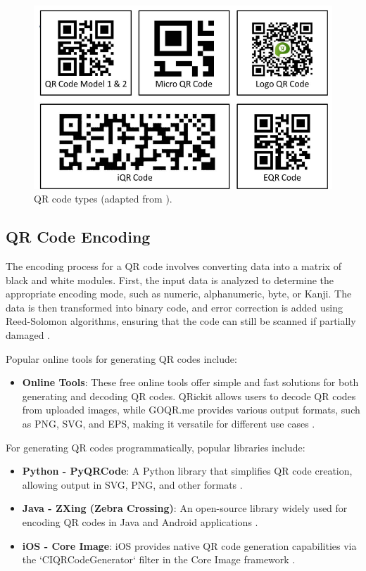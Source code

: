 \begin{figure}
	\centering
	\includegraphics[width=0.7\linewidth]{assets/ch2/qr_codes_type}
	\caption{QR code types (adapted from \cite{Tiwari2016}).}
	\label{qr_code_type}
\end{figure}

\subsection{QR Code Encoding}  
The encoding process for a QR code involves converting data into a matrix of black and white modules. First, the input data is analyzed to determine the appropriate encoding mode, such as numeric, alphanumeric, byte, or Kanji. The data is then transformed into binary code, and error correction is added using Reed-Solomon algorithms, ensuring that the code can still be scanned if partially damaged \cite{Tiwari2016}.

Popular online tools for generating QR codes include:
\begin{itemize}
	\item \textbf{Online Tools}: These free online tools offer simple and fast solutions for both generating and decoding QR codes. QRickit allows users to decode QR codes from uploaded images, while GOQR.me provides various output formats, such as PNG, SVG, and EPS, making it versatile for different use cases \cite{QRCodeMonkey2024}\cite{QRTiger2024}.
	
	
\end{itemize}

For generating QR codes programmatically, popular libraries include:
\begin{itemize}
	\item \textbf{Python - PyQRCode}: A Python library that simplifies QR code creation, allowing output in SVG, PNG, and other formats \cite{PyQRCode2024}.
	\item \textbf{Java - ZXing (Zebra Crossing)}: An open-source library widely used for encoding QR codes in Java and Android applications \cite{ZXing2024}.
	\item \textbf{iOS - Core Image}: iOS provides native QR code generation capabilities via the `CIQRCodeGenerator` filter in the Core Image framework \cite{CoreImage2024}.
\end{itemize}

